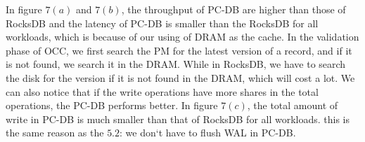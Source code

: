 In figure $7(a)$ and $7(b)$, the throughput of PC-DB are higher than those of RocksDB and the latency of PC-DB is smaller than the RocksDB for all workloads, which is because of our using of DRAM as the cache. In the validation phase of OCC, we first search the PM for the latest version of a record, and if it is not found, we search it in the DRAM. While in RocksDB, we have to search the disk for the version if it is not found in the DRAM, which will cost a lot. We can also notice that if the write operations have more shares in the total operations, the PC-DB performs better.
In figure $7(c)$, the total amount of write in PC-DB is much smaller than that of RocksDB for all workloads. this is the same reason as the $5.2$: we don`t have to flush WAL in PC-DB.